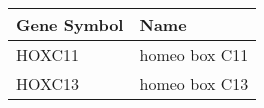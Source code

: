 \begin{tabular}{ll}
\toprule
Gene Symbol &          Name \\
\midrule
     HOXC11 & homeo box C11 \\
     HOXC13 & homeo box C13 \\
\bottomrule
\end{tabular}
